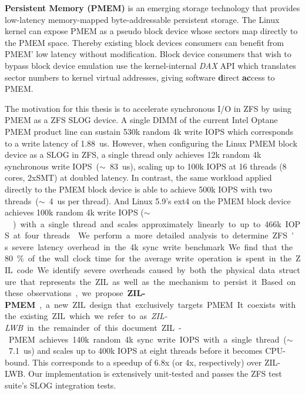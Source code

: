 \documentclass[12pt,a4paper,twoside]{book}
\begin{document}
\textbf{Persistent Memory (PMEM)} is an emerging storage technology that provides low-latency memory-mapped byte-addressable persistent storage.
The Linux kernel can expose PMEM as a pseudo block device whose sectors map directly to the PMEM space.
Thereby existing block devices consumers can benefit from PMEM' low latency without modification.
Block device consumers that wish to bypass block device emulation use the kernel-internal \textit{DAX} API which translates sector numbers to kernel virtual addresses, giving software \textbf{d}irect \textbf{ac}cess to PMEM.

The motivation for this thesis is to accelerate synchronous I/O in ZFS by using PMEM as a ZFS SLOG device.
A single DIMM of the current Intel Optane PMEM product line can sustain 530k random 4k write IOPS which corresponds to a write latency of \SI{1.88}{us}.
However, when configuring the Linux PMEM block device as a SLOG in ZFS, a single thread only achieves 12k random 4k synchronous write IOPS~($\sim$~\SI{83}{us}), scaling up to 100k IOPS at 16 threads (8 cores, 2xSMT) at doubled latency.
In contrast, the same workload applied directly to the PMEM block device is able to achieve 500k IOPS with two threads~($\sim$~\SI{4}{us} per thread).
And Linux 5.9's ext4 on the PMEM block device achieves 100k random 4k write IOPS ($\sim$~\SI{}) with a single thread and scales approximately linearly to up to 466k IOPS at four threads.

We perform a more detailed analysis to determine ZFS's severe latency overhead in the 4k sync write benchmark.
We find that the 80\% of the wall clock time for the average write operation is spent in the ZIL code.
We identify severe overheads caused by both the physical data structure that represents the ZIL as well as the mechanism to persist it.

Based on these observations, we propose \textbf{ZIL-PMEM}, a new ZIL design that exclusively targets PMEM.
It coexists with the existing ZIL which we refer to as \textit{ZIL-LWB} in the remainder of this document.
ZIL-PMEM achieves 140k random 4k sync write IOPS with a single thread~($\sim$~\SI{7.1}{us}) and scales up to 400k IOPS at eight threads before it becomes CPU-bound.
This corresponds to a speedup of 6.8x (or 4x, respectively) over ZIL-LWB.
Our implementation is extensively unit-tested and passes the ZFS test suite's SLOG integration tests.
\end{document}
